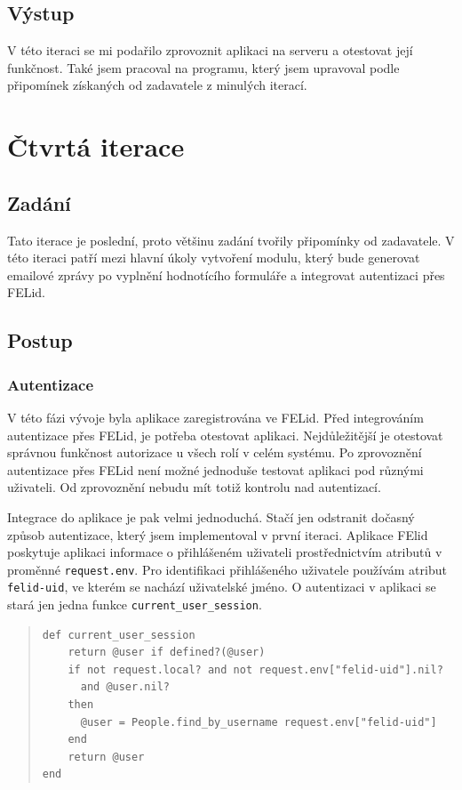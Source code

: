 \subsection{Výstup} 
V této iteraci se mi podařilo zprovoznit aplikaci na serveru a otestovat její funkčnost. Také jsem pracoval na programu, který jsem upravoval podle připomínek získaných od zadavatele z minulých iterací.

\section{Čtvrtá iterace}
\subsection{Zadání}
Tato iterace je poslední, proto většinu zadání tvořily připomínky od zadavatele. V této iteraci patří mezi hlavní úkoly vytvoření modulu, který bude generovat emailové zprávy po vyplnění hodnotícího formuláře a integrovat autentizaci přes FELid. 
\subsection{Postup}
\subsubsection{Autentizace}
V této fázi vývoje byla aplikace zaregistrována ve FELid. Před integrováním autentizace přes FELid, je potřeba otestovat aplikaci. Nejdůležitější je otestovat správnou funkčnost autorizace u všech rolí v celém systému. Po zprovoznění autentizace přes FELid není možné jednoduše testovat aplikaci pod různými uživateli. Od zprovoznění nebudu mít totiž kontrolu nad autentizací.

Integrace do aplikace je pak velmi jednoduchá. Stačí jen odstranit dočasný způsob autentizace, který jsem implementoval v první iteraci. Aplikace FElid poskytuje aplikaci informace o přihlášeném uživateli prostřednictvím atributů v proměnné \verb|request.env|. Pro identifikaci přihlášeného uživatele používám atribut \verb|felid-uid|, ve kterém se nachází uživatelské jméno. O autentizaci v aplikaci se stará jen jedna funkce \verb|current_user_session|.

\begin{quote}
\begin{verbatim}
def current_user_session
    return @user if defined?(@user)
    if not request.local? and not request.env["felid-uid"].nil? 
      and @user.nil? 
    then
      @user = People.find_by_username request.env["felid-uid"]
    end
    return @user
end
\end{verbatim} 
\end{quote}


